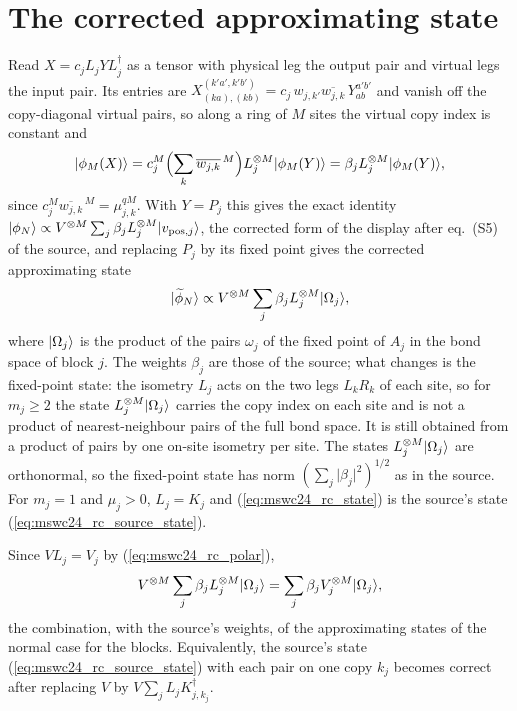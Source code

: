 \documentclass{article}
\begin{document}
\section{The corrected approximating state}
Read $X=c_jL_jYL_j^\dagger$ as a tensor with physical leg the output pair and
virtual legs the input pair. Its entries are
$X^{(k'a',k'b')}_{(ka),(kb)}=c_j\,w_{j,k'}\overline{w_{j,k}}\,Y^{a'b'}_{ab}$ and
vanish off the copy-diagonal virtual pairs, so along a ring of $M$ sites the
virtual copy index is constant and
\begin{align*}
    |\phi_M(X)\rangle=c_j^M\Bigl(\sum_k\overline{w_{j,k}}^{\,M}\Bigr)
    L_j^{\otimes M}|\phi_M(Y)\rangle
    =\beta_jL_j^{\otimes M}|\phi_M(Y)\rangle,
\end{align*}
since $c_j^M\overline{w_{j,k}}^{\,M}=\mu_{j,k}^{qM}$. With $Y=P_j$ this gives the
exact identity
$|\phi_N\rangle\propto V^{\otimes M}\sum_j\beta_jL_j^{\otimes M}|v_{\mathrm{pos},j}\rangle$,
the corrected form of the display after eq.~(S5) of the source, and replacing
$P_j$ by its fixed point gives the corrected approximating state
\begin{align}
    |\widetilde\phi_N\rangle\propto V^{\otimes M}\sum_j\beta_jL_j^{\otimes M}|\Omega_j\rangle,
    \label{eq:mswc24_rc_state}
\end{align}
where $|\Omega_j\rangle$ is the product of the pairs $\omega_j$ of the fixed point of
$A_j$ in the bond space of block $j$. The weights $\beta_j$ are those of the
source; what changes is the fixed-point state: the isometry $L_j$ acts on the
two legs $L_kR_k$ of each site, so for $m_j\geq2$ the state
$L_j^{\otimes M}|\Omega_j\rangle$ carries the copy index on each site and is not a
product of nearest-neighbour pairs of the full bond space. It is still obtained
from a product of pairs by one on-site isometry per site. The states
$L_j^{\otimes M}|\Omega_j\rangle$ are orthonormal, so the fixed-point state has norm
$(\sum_j\lvert\beta_j\rvert^2)^{1/2}$ as in the source. For $m_j=1$ and
$\mu_j>0$, $L_j=K_j$ and (\ref{eq:mswc24_rc_state}) is the source's state
(\ref{eq:mswc24_rc_source_state}).

Since $VL_j=V_j$ by (\ref{eq:mswc24_rc_polar}),
\begin{align}
    V^{\otimes M}\sum_j\beta_jL_j^{\otimes M}|\Omega_j\rangle
    =\sum_j\beta_jV_j^{\otimes M}|\Omega_j\rangle,
    \label{eq:mswc24_rc_after_v}
\end{align}
the combination, with the source's weights, of the approximating states of the
normal case for the blocks. Equivalently, the source's
state (\ref{eq:mswc24_rc_source_state}) with each pair on one copy
$k_j$ becomes correct after replacing $V$ by $V\sum_jL_jK_{j,k_j}^\dagger$.
\end{document}
